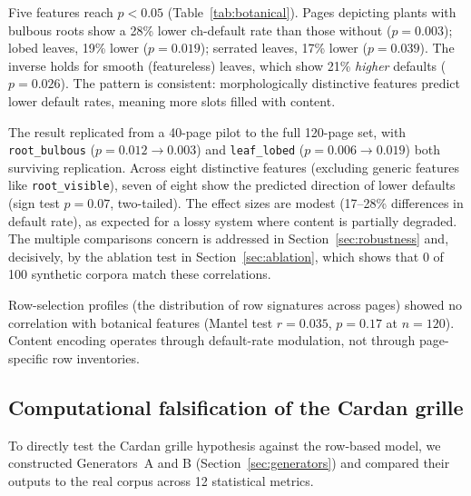 \documentclass[12pt]{article}
\begin{document}
Five features reach $p < 0.05$ (Table~\ref{tab:botanical}). Pages depicting plants with bulbous roots show a 28\% lower ch-default rate than those without ($p = 0.003$); lobed leaves, 19\% lower ($p = 0.019$); serrated leaves, 17\% lower ($p = 0.039$). The inverse holds for smooth (featureless) leaves, which show 21\% \emph{higher} defaults ($p = 0.026$). The pattern is consistent: morphologically distinctive features predict lower default rates, meaning more slots filled with content.

The result replicated from a 40-page pilot to the full 120-page set, with \texttt{root\_bulbous} ($p = 0.012 \to 0.003$) and \texttt{leaf\_lobed} ($p = 0.006 \to 0.019$) both surviving replication. Across eight distinctive features (excluding generic features like \texttt{root\_visible}), seven of eight show the predicted direction of lower defaults (sign test $p = 0.07$, two-tailed). The effect sizes are modest (17--28\% differences in default rate), as expected for a lossy system where content is partially degraded. The multiple comparisons concern is addressed in Section~\ref{sec:robustness} and, decisively, by the ablation test in Section~\ref{sec:ablation}, which shows that 0 of 100 synthetic corpora match these correlations.

Row-selection profiles (the distribution of row signatures across pages) showed no correlation with botanical features (Mantel test $r = 0.035$, $p = 0.17$ at $n = 120$). Content encoding operates through default-rate modulation, not through page-specific row inventories.

\subsection{Computational falsification of the Cardan grille}
\label{sec:falsification}

To directly test the Cardan grille hypothesis against the row-based model, we constructed Generators~A and B (Section~\ref{sec:generators}) and compared their outputs to the real corpus across 12 statistical metrics.
\end{document}
